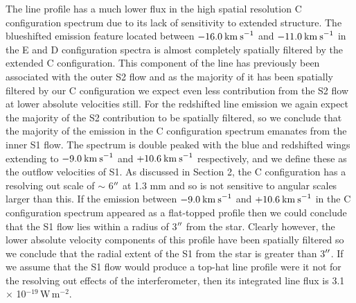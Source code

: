 \documentclass[iop]{emulateapj}
\begin{document}
The line profile has a much lower flux in the high spatial resolution C configuration spectrum due to its lack of sensitivity to extended structure. The blueshifted emission feature located between $-16.0\>{\rm km\>s}^{-1}$ and $-11.0\>{\rm km\>s}^{-1}$ in the E and D configuration spectra is almost completely spatially filtered by the extended C configuration. This component of the line has previously been associated with the outer S2 flow \citep{1987ApJ...313..400H} and as the majority of it has been spatially filtered by our C configuration we expect even less contribution from the S2 flow at lower absolute velocities still. For the redshifted line emission we again expect the majority of the S2 contribution to be spatially filtered, so we conclude that the majority of the emission in the C configuration spectrum emanates from the inner S1 flow. The spectrum is double peaked with the blue and redshifted wings extending to $-9.0\>{\rm km\>s}^{-1}$ and $+10.6\>{\rm km\>s}^{-1}$ respectively, and we define these as the outflow velocities of S1. As discussed in Section 2, the C configuration has a resolving out scale of $\sim$ 6$\mbox{$^{\prime\prime}$}$ at 1.3 mm and so is not sensitive to angular scales larger than this. If the emission between $-9.0\>{\rm km\>s}^{-1}$ and $+10.6\>{\rm km\>s}^{-1}$ in the C configuration spectrum appeared as a flat-topped profile then we could conclude that the S1 flow lies within a radius of 3$\mbox{$^{\prime\prime}$}$ from the star. Clearly however, the lower absolute velocity components of this profile have been spatially filtered so we conclude that the radial extent of the S1 from the star is greater than 3$\mbox{$^{\prime\prime}$}$. If we assume that the S1 flow would produce a top-hat line profile were it not for the resolving out effects of the interferometer, then its integrated line flux is 3.1 $\times$ 10${}^{-19}$\,W\,m${}^{-2}$.
\end{document}
